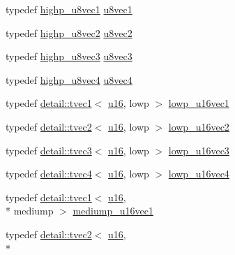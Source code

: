 \begin{DoxyCompactItemize}
typedef \hyperlink{group__gtc__type__precision_ga8e7e9156357a2b748fe39702c3bdbeec}{highp\-\_\-u8vec1} \hyperlink{group__gtc__type__precision_gaf0155c700da11c0b5518a777d1f0cd23}{u8vec1}
\item 
typedef \hyperlink{group__gtc__type__precision_ga9aed4b3bacd37a43ec369bcf76be144a}{highp\-\_\-u8vec2} \hyperlink{group__gtc__type__precision_gaa7ea171741c23b5bb2a3c91fe8c84e8a}{u8vec2}
\item 
typedef \hyperlink{group__gtc__type__precision_ga52bdf53a4f05023c13a9b817526d249f}{highp\-\_\-u8vec3} \hyperlink{group__gtc__type__precision_ga3b4624ecd0485fe5143f956864e7934e}{u8vec3}
\item 
typedef \hyperlink{group__gtc__type__precision_ga3a46f19674a65471988b41ffdaa834c5}{highp\-\_\-u8vec4} \hyperlink{group__gtc__type__precision_gaaf6b3d127698d893de8652deedfd3d9b}{u8vec4}
\item 
typedef \hyperlink{structglm_1_1detail_1_1tvec1}{detail\-::tvec1}$<$ \hyperlink{group__gtc__type__precision_gae7a1571503f83d2264ddfa705a6b082a}{u16}, lowp $>$ \hyperlink{group__gtc__type__precision_ga25464b09e8e3c63f6896605e0c997eb1}{lowp\-\_\-u16vec1}
\item 
typedef \hyperlink{structglm_1_1detail_1_1tvec2}{detail\-::tvec2}$<$ \hyperlink{group__gtc__type__precision_gae7a1571503f83d2264ddfa705a6b082a}{u16}, lowp $>$ \hyperlink{group__gtc__type__precision_gaff5ca5a8bc621bb8f4b28f046c0de508}{lowp\-\_\-u16vec2}
\item 
typedef \hyperlink{structglm_1_1detail_1_1tvec3}{detail\-::tvec3}$<$ \hyperlink{group__gtc__type__precision_gae7a1571503f83d2264ddfa705a6b082a}{u16}, lowp $>$ \hyperlink{group__gtc__type__precision_ga74d5491c9ee66d068309d200601e907b}{lowp\-\_\-u16vec3}
\item 
typedef \hyperlink{structglm_1_1detail_1_1tvec4}{detail\-::tvec4}$<$ \hyperlink{group__gtc__type__precision_gae7a1571503f83d2264ddfa705a6b082a}{u16}, lowp $>$ \hyperlink{group__gtc__type__precision_gab0210f390e7d75fa8eb42128a05ff23a}{lowp\-\_\-u16vec4}
\item 
typedef \hyperlink{structglm_1_1detail_1_1tvec1}{detail\-::tvec1}$<$ \hyperlink{group__gtc__type__precision_gae7a1571503f83d2264ddfa705a6b082a}{u16}, \\*
mediump $>$ \hyperlink{group__gtc__type__precision_gacb35d25d662b2a6396d094197ca834f0}{mediump\-\_\-u16vec1}
\item 
typedef \hyperlink{structglm_1_1detail_1_1tvec2}{detail\-::tvec2}$<$ \hyperlink{group__gtc__type__precision_gae7a1571503f83d2264ddfa705a6b082a}{u16}, \\*

\end{DoxyCompactItemize}
